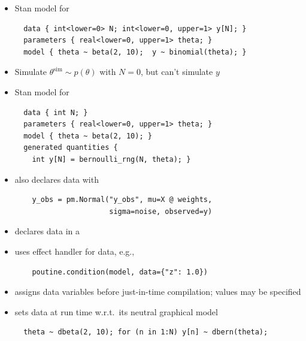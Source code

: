 \documentclass[10pt]{report}
\newcommand{\simvar}[1]{#1^{\textrm{sim}}}
\begin{document}
\begin{itemize}
\item Stan model for 
\vspace*{-6pt}
{\footnotesize
\begin{verbatim}
  data { int<lower=0> N; int<lower=0, upper=1> y[N]; }
  parameters { real<lower=0, upper=1> theta; }
  model { theta ~ beta(2, 10);  y ~ binomial(theta); }
\end{verbatim}
}
\item Simulate $\simvar{\theta} \sim p(\theta)$ with $N = 0$, but
  can't simulate $y$
\item Stan model for 
\vspace*{-6pt}
{\footnotesize
\begin{verbatim}
  data { int N; }
  parameters { real<lower=0, upper=1> theta; }
  model { theta ~ beta(2, 10); }
  generated quantities { 
    int y[N] = bernoulli_rng(N, theta); }
\end{verbatim}
}
\end{itemize}

\begin{itemize}
\item {} also declares data with 
\vspace*{-6pt}
{\footnotesize 
\begin{verbatim}
    y_obs = pm.Normal("y_obs", mu=X @ weights, 
                      sigma=noise, observed=y) 
\end{verbatim}
\vspace*{-8pt}
}
\item {} declares data in a 
\item {} uses effect handler  for data, e.g., 
\vspace*{-6pt}
{\footnotesize 
\begin{verbatim}
    poutine.condition(model, data={"z": 1.0})
\end{verbatim}
\vspace*{-8pt}
}
\item {} assigns data variables before
  just-in-time compilation; values may be specified
\item {} sets data at run time w.r.t.\ its neutral graphical model
\vspace*{-12pt}
{\footnotesize 
\begin{verbatim}
  theta ~ dbeta(2, 10); for (n in 1:N) y[n] ~ dbern(theta); 
\end{verbatim}}
\end{itemize}
\end{document}
